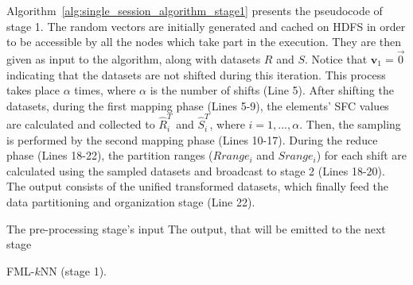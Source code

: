 Algorithm~\ref{alg:single_session_algorithm_stage1} presents the pseudocode of stage 1. The random vectors are initially generated and cached on HDFS in order to be accessible by all the nodes which take part in the execution. They are then given as input to the algorithm, along with datasets $R$ and $S$. Notice that $\textbf{v}_1=\overrightarrow{0}$ indicating that the datasets are not shifted during this iteration. This process takes place $\alpha$ times, where $\alpha$  is the number of shifts (Line 5). After shifting the datasets, during the first mapping phase (Lines 5-9), the elements' SFC values are calculated and collected to $\hat{R}^T_i$ and $\hat{S}^T_i$, where $i=1,...,\alpha$. Then, the sampling is performed by the second mapping phase (Lines 10-17). During the reduce phase (Lines 18-22), the partition ranges ($Rrange_i$ and $Srange_i$) for each shift are calculated using the sampled datasets and broadcast to stage 2 (Lines 18-20). The output consists of the unified transformed datasets, which finally feed the data partitioning and organization stage (Line 22).

\begin{algorithm}[!ht]
	\DontPrintSemicolon
	\begin{footnotesize}
	\Comment The pre-processing stage's input \;
	\Comment The output, that will be emitted to the next stage \;
	\BlankLine
	\end{footnotesize}
	\caption{FML-$k$NN (stage 1).}
	\label{alg:single_session_algorithm_stage1}	
\end{algorithm}

